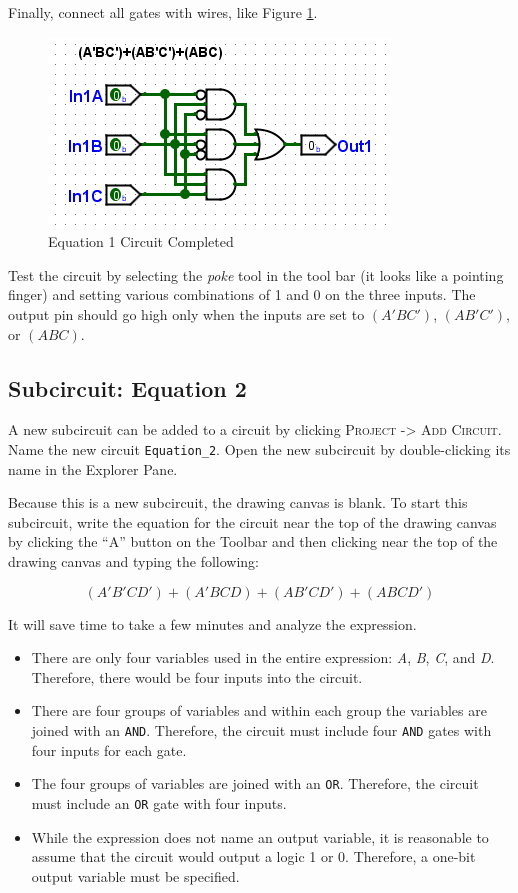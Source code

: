 Finally, connect all gates with wires, like Figure \ref{fig:bool-04}. 

\begin{figure}[H]
	\centering
	\includegraphics[width=\maxwidth{.95\linewidth}]{gfx/bool-04}
	\caption{Equation 1 Circuit Completed}
	\label{fig:bool-04}
\end{figure}

Test the circuit by selecting the \textit{poke} tool in the tool bar (it looks like a pointing finger) and setting various combinations of 1 and 0 on the three inputs. The output pin should go high only when the inputs are set to $ (A'BC') $, $ (AB'C') $, or $ (ABC) $.

\subsection{Subcircuit: Equation 2}

A new subcircuit can be added to a circuit by clicking \textsc{Project -> Add Circuit}. Name the new circuit \lstinline[columns=fixed]|Equation_2|. Open the new subcircuit by double-clicking its name in the Explorer Pane. 

Because this is a new subcircuit, the drawing canvas is blank. To start this subcircuit, write the equation for the circuit near the top of the drawing canvas by clicking the ``A'' button on the Toolbar and then clicking near the top of the drawing canvas and typing the following:

\[ (A'B'CD')+(A'BCD)+(AB'CD')+(ABCD') \]

It will save time to take a few minutes and analyze the expression. 

\begin{itemize}
	\item There are only four variables used in the entire expression: \textit{A}, \textit{B}, \textit{C}, and \textit{D}. Therefore, there would be four inputs into the circuit.
	\item There are four groups of variables and within each group the variables are joined with an \texttt{AND}. Therefore, the circuit must include four \texttt{AND} gates with four inputs for each gate.
	\item The four groups of variables are joined with an \texttt{OR}. Therefore, the circuit must include an \texttt{OR} gate with four inputs.
	\item While the expression does not name an output variable, it is reasonable to assume that the circuit would output a logic 1 or 0. Therefore, a one-bit output variable must be specified.
\end{itemize}

